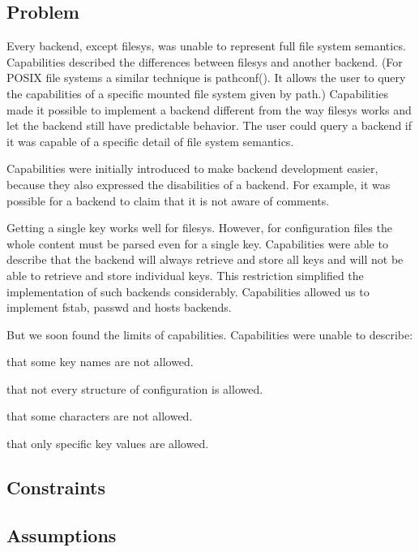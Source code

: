 \subsection*{Problem}

Every backend, except {\ttfamily filesys}, was unable to represent full file system semantics. Capabilities described the differences between {\ttfamily filesys} and another backend. (For P\+O\+S\+IX file systems a similar technique is {\ttfamily pathconf()}. It allows the user to query the capabilities of a specific mounted file system given by path.) Capabilities made it possible to implement a backend different from the way {\ttfamily filesys} works and let the backend still have predictable behavior. The user could query a backend if it was capable of a specific detail of file system semantics.

Capabilities were initially introduced to make backend development easier, because they also expressed the disabilities of a backend. For example, it was possible for a backend to claim that it is not aware of comments.

Getting a single key works well for {\ttfamily filesys}. However, for configuration files the whole content must be parsed even for a single key. Capabilities were able to describe that the backend will always retrieve and store all keys and will not be able to retrieve and store individual keys. This restriction simplified the implementation of such backends considerably. Capabilities allowed us to implement fstab, passwd and hosts backends.

But we soon found the limits of capabilities. Capabilities were unable to describe\+:


\begin{DoxyItemize}
\item that some key names are not allowed.
\item that not every structure of configuration is allowed.
\item that some characters are not allowed.
\item that only specific key values are allowed.
\end{DoxyItemize}

\subsection*{Constraints}

\subsection*{Assumptions}

